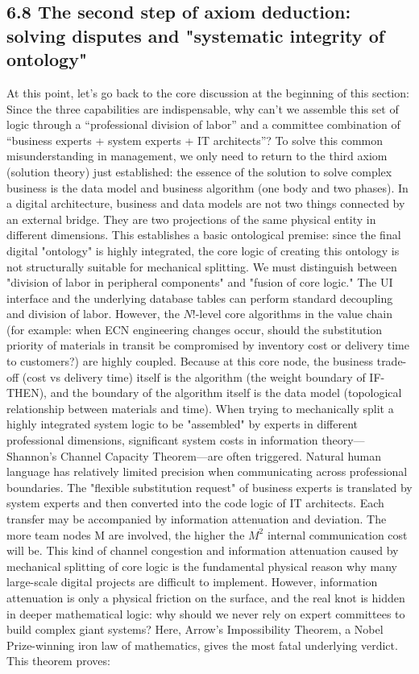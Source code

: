 \documentclass[11pt,a4paper]{article}
\begin{document}
\subsection*{6.8 The second step of axiom deduction: solving disputes and "systematic integrity of ontology"}


At this point, let’s go back to the core discussion at the beginning of this section: Since the three capabilities are indispensable, why can’t we assemble this set of logic through a “professional division of labor” and a committee combination of “business experts + system experts + IT architects”? To solve this common misunderstanding in management, we only need to return to the third axiom (solution theory) just established: the essence of the solution to solve complex business is the data model and business algorithm (one body and two phases). In a digital architecture, business and data models are not two things connected by an external bridge. They are two projections of the same physical entity in different dimensions. This establishes a basic ontological premise: since the final digital "ontology" is highly integrated, the core logic of creating this ontology is not structurally suitable for mechanical splitting. We must distinguish between "division of labor in peripheral components" and "fusion of core logic." The UI interface and the underlying database tables can perform standard decoupling and division of labor. However, the $N!$-level core algorithms in the value chain (for example: when ECN engineering changes occur, should the substitution priority of materials in transit be compromised by inventory cost or delivery time to customers?) are highly coupled. Because at this core node, the business trade-off (cost vs delivery time) itself is the algorithm (the weight boundary of IF-THEN), and the boundary of the algorithm itself is the data model (topological relationship between materials and time). When trying to mechanically split a highly integrated system logic to be "assembled" by experts in different professional dimensions, significant system costs in information theory—Shannon's Channel Capacity Theorem—are often triggered. Natural human language has relatively limited precision when communicating across professional boundaries. The "flexible substitution request" of business experts is translated by system experts and then converted into the code logic of IT architects. Each transfer may be accompanied by information attenuation and deviation. The more team nodes M are involved, the higher the $M^2$ internal communication cost will be. This kind of channel congestion and information attenuation caused by mechanical splitting of core logic is the fundamental physical reason why many large-scale digital projects are difficult to implement. However, information attenuation is only a physical friction on the surface, and the real knot is hidden in deeper mathematical logic: why should we never rely on expert committees to build complex giant systems? Here, Arrow's Impossibility Theorem, a Nobel Prize-winning iron law of mathematics, gives the most fatal underlying verdict. This theorem proves: 
\end{document}
